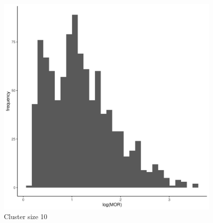\documentclass[
  letterpaper,
  DIV=11,
  numbers=noendperiod,
  titlepage]{scrartcl}
\begin{document}
\begin{figure}
\begin{minipage}[t]{0.24\linewidth}
{{\includegraphics{../../plots/two-lvl-ran-slope/low-prev/hist_30_10_two_lvl_slp_low_prev_q1.png}

}

\caption{Cluster size 10}

}

\end{minipage}%
%
\begin{minipage}[t]{0.24\linewidth}

{\centering 

}
\end{minipage}
\end{figure}
\end{document}
